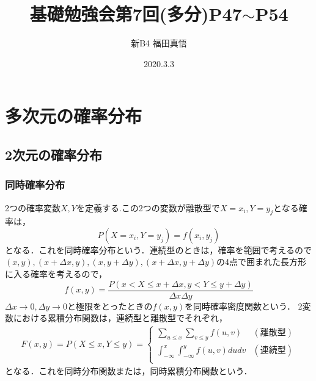 \documentclass[autodetect-engine,dvipdfmx-if-dvi,ja=standard,a4paper,11pt]{bxjsarticle} %
\title{基礎勉強会第7回(多分)P47$\sim$P54} %
\author{新B4 福田真悟} %
\date{2020.3.3}%
\begin{document}
\maketitle %
\setcounter{section}{1}
\setcounter{section}{2}
\section{多次元の確率分布}%
\subsection{2次元の確率分布}
\subsubsection{同時確率分布}
 2つの確率変数$X,Y$を定義する.この2つの変数が離散型で$X=x_i,Y=y_j$となる確率は，
\begin{equation}
P(X=x_i,Y=y_j)=f(x_i,y_j)
\end{equation}
となる．これを同時確率分布という．連続型のときは，確率を範囲で考えるので$(x,y),(x+{\Delta}x,y),(x,y+{\Delta}y),(x+{\Delta}x,y+{\Delta}y)$の4点で囲まれた長方形に入る確率を考えるので，
\begin{equation}
f(x,y)=\frac{P(x<X\leq x+{\Delta}x,y<Y\leq y+{\Delta}y)}{{\Delta}x{\Delta}y} 
\end{equation}
${\Delta}x\rightarrow0,{\Delta}y\rightarrow0$と極限をとったときの$f(x,y)$を同時確率密度関数という．
 2変数における累積分布関数は，連続型と離散型でそれぞれ，
\begin{eqnarray}
F(x,y)=P(X\leq x,Y\leq y)=\left\{ \begin{array}{ll}
\displaystyle\sum_{u\leq x}\sum_{v\leq y}f(u,v) &  (\mbox{離散型}) \\
\displaystyle\int_{-\infty}^{x}\int_{-\infty}^{y}f(u,v)dudv & (\mbox{連続型}) \\
\end{array} \right.
\end{eqnarray}
となる．これを同時分布関数または，同時累積分布関数という．
\end{document}
